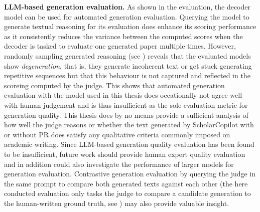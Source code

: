 \textbf{LLM-based generation evaluation.} As shown in the evaluation, the decoder model  can be used for automated generation evaluation. Querying the model to generate textual reasoning for its evaluation does enhance its scoring performance as it consistently reduces the variance between the computed scores when the decoder is tasked to evaluate one generated paper multiple times. However, randomly sampling generated reasoning (see ) reveals that the evaluated models show \emph{degeneration}, that is, they generate incoherent text or get stuck generating repetitive sequences \cite{ji2023survey} but that this behaviour is not captured and reflected in the scoreing computed by the judge. This shows that automated generation evaluation with the model used in this thesis does occationally not agree well with human judgement and is thus insufficient as the sole evaluation metric for generation quality. This thesis does by no means provide a sufficient analysis of how well the judge reasons or whether the text generated by ScholarCopilot with or without PR does satisfy any qualitative criteria commonly imposed on academic writing. Since LLM-based generation quality evaluation has been found to be insufficient, future work should provide human expert quality evaluation and in addition could also investigate the performance of larger models for generation evaluation. Contrastive generation evaluation by querying the judge in the same prompt to compare both generated texts against each other (the here conducted evaluation only tasks the judge to compare a candidate generation to the human-written ground truth, see ) may also provide valuable insight.

